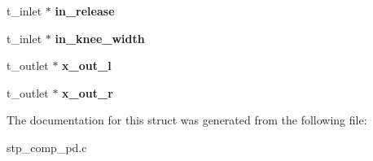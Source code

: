 \begin{DoxyCompactItemize}
\mbox{\label{structstp__comp__tilde_ab43d1eee7fb2f5f75bbce7803f547c19}} 
t\+\_\+inlet $\ast$ {\bfseries in\+\_\+release}
\item 
\mbox{\label{structstp__comp__tilde_ab0d64184da95d88c554220b9adeaa3ee}} 
t\+\_\+inlet $\ast$ {\bfseries in\+\_\+knee\+\_\+width}
\item 
\mbox{\label{structstp__comp__tilde_a1cddbee4e7e6844e96f4723e1de5c729}} 
t\+\_\+outlet $\ast$ {\bfseries x\+\_\+out\+\_\+l}
\item 
\mbox{\label{structstp__comp__tilde_ac9e44561d272e0c3743f07d288fc649f}} 
t\+\_\+outlet $\ast$ {\bfseries x\+\_\+out\+\_\+r}
\end{DoxyCompactItemize}


The documentation for this struct was generated from the following file\+:\begin{DoxyCompactItemize}
\item 
stp\+\_\+comp\+\_\+pd.\+c\end{DoxyCompactItemize}
